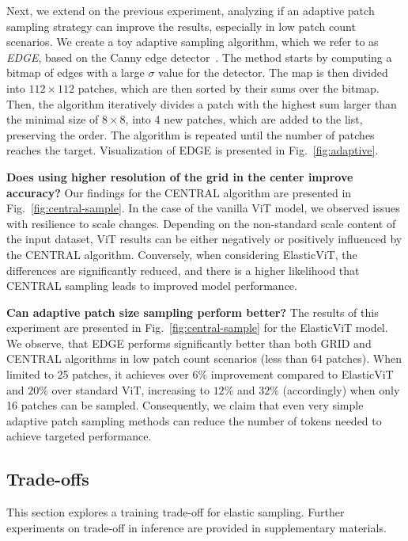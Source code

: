 \documentclass[10pt,twocolumn,letterpaper]{article}
\newcommand{\ours}[0]{ElasticViT\xspace}
\begin{document}
Next, we extend on the previous experiment, analyzing if an adaptive patch sampling strategy can improve the results, especially in low patch count scenarios. We create a toy adaptive sampling algorithm, which we refer to as \textit{EDGE}, based on the Canny edge detector~\cite{canny1986computational}. The method starts by computing a bitmap of edges with a large $\sigma$ value for the detector. The map is then divided into $112\times112$ patches, which are then sorted by their sums over the bitmap. Then, the algorithm iteratively divides a patch with the highest sum larger than the minimal size of $8\times8$, into 4 new patches, which are added to the list, preserving the order. The algorithm is repeated until the number of patches reaches the target. Visualization of EDGE is presented in Fig.~\ref{fig:adaptive}.

\textbf{Does using higher resolution of the grid in the center improve accuracy?}
Our findings for the CENTRAL algorithm are presented in Fig.~\ref{fig:central-sample}. In the case of the vanilla ViT model, we observed issues with resilience to scale changes. Depending on the non-standard scale content of the input dataset, ViT results can be either negatively or positively influenced by the CENTRAL algorithm. Conversely, when considering ElasticViT, the differences are significantly reduced, and there is a higher likelihood that CENTRAL sampling leads to improved model performance.


\textbf{Can adaptive patch size sampling perform better?}
The results of this experiment are presented in Fig.~\ref{fig:central-sample} for the \ours{} model. We observe, that EDGE performs significantly better than both GRID and CENTRAL algorithms in low patch count scenarios (less than 64 patches). When limited to 25 patches, it achieves over $6\%$ improvement compared to \ours{} and $20\%$ over standard ViT, increasing to $12\%$ and $32\%$ (accordingly) when only 16 patches can be sampled. Consequently, we claim that even very simple adaptive patch sampling methods can reduce the number of tokens needed to achieve targeted performance.

\subsection{Trade-offs} \label{sec:tradeoff}

This section explores a training trade-off for elastic sampling. Further experiments on trade-off in inference are provided in supplementary materials.
\end{document}
